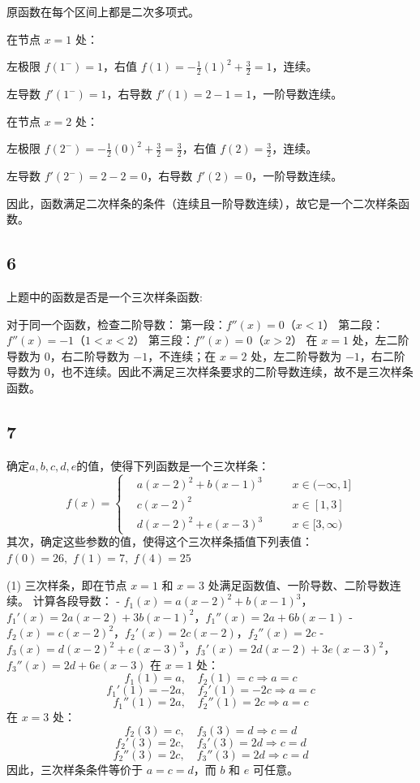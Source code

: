 \documentclass{article}
\begin{document}
原函数在每个区间上都是二次多项式。  

在节点 \(x=1\) 处：

左极限 \(f(1^-)=1\)，右值 \(f(1)=-\frac{1}{2}(1)^2+\frac{3}{2}=1\)，连续。

左导数 \(f'(1^-)=1\)，右导数 \(f'(1)=2-1=1\)，一阶导数连续。

在节点 \(x=2\) 处：

左极限 \(f(2^-)=-\frac{1}{2}(0)^2+\frac{3}{2}=\frac{3}{2}\)，右值 \(f(2)=\frac{3}{2}\)，连续。

左导数 \(f'(2^-)=2-2=0\)，右导数 \(f'(2)=0\)，一阶导数连续。

因此，函数满足二次样条的条件（连续且一阶导数连续），故它是一个二次样条函数。

\subsection*{6}
上题中的函数是否是一个三次样条函数:

对于同一个函数，检查二阶导数：
第一段：\(f''(x)=0\)（\(x<1\)）
第二段：\(f''(x)=-1\)（\(1<x<2\)）
第三段：\(f''(x)=0\)（\(x>2\)）
在 \(x=1\) 处，左二阶导数为 \(0\)，右二阶导数为 \(-1\)，不连续；在 \(x=2\) 处，左二阶导数为 \(-1\)，右二阶导数为 \(0\)，也不连续。因此不满足三次样条要求的二阶导数连续，故不是三次样条函数。


\subsection*{7}
确定$a,b,c,d,e$的值，使得下列函数是一个三次样条：
$$ f(x)=\left\{
\begin{aligned}
&a(x-2)^2 +b(x-1)^3&\quad & x\in (-\infty, 1]\\
&c(x-2)^2& \quad & x\in [1,3] \\
&d(x-2)^2 +e(x-3)^3&\quad & x\in [3,\infty)
\end{aligned}
\right.
$$  
其次，确定这些参数的值，使得这个三次样条插值下列表值：
$f(0)=26,\,\,f(1)=7,\,\,f(4)=25\,\,$

(1)
三次样条，即在节点 \(x=1\) 和 \(x=3\) 处满足函数值、一阶导数、二阶导数连续。
计算各段导数：
- \(f_1(x)=a(x-2)^2+b(x-1)^3\)，\(f_1'(x)=2a(x-2)+3b(x-1)^2\)，\(f_1''(x)=2a+6b(x-1)\)
- \(f_2(x)=c(x-2)^2\)，\(f_2'(x)=2c(x-2)\)，\(f_2''(x)=2c\)
- \(f_3(x)=d(x-2)^2+e(x-3)^3\)，\(f_3'(x)=2d(x-2)+3e(x-3)^2\)，\(f_3''(x)=2d+6e(x-3)\)
在 \(x=1\) 处：
\[
f_1(1)=a,\quad f_2(1)=c \Rightarrow a=c
\]
\[
f_1'(1)=-2a,\quad f_2'(1)=-2c \Rightarrow a=c
\]
\[
f_1''(1)=2a,\quad f_2''(1)=2c \Rightarrow a=c
\]
在 \(x=3\) 处：
\[
f_2(3)=c,\quad f_3(3)=d \Rightarrow c=d
\]
\[
f_2'(3)=2c,\quad f_3'(3)=2d \Rightarrow c=d
\]
\[
f_2''(3)=2c,\quad f_3''(3)=2d \Rightarrow c=d
\]
因此，三次样条条件等价于 \(a=c=d\)，而 \(b\) 和 \(e\) 可任意。
\end{document}
